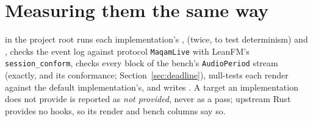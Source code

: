 \section{Measuring them the same way}
 in the project root runs each implementation's
,  (twice, to test determinism) and , checks
the event log against protocol \texttt{MaqamLive} with LeanFM's
\texttt{session\_conform}, checks every block of the bench's \texttt{AudioPeriod}
stream (exactly, and its conformance; Section~\ref{sec:deadline}), null-tests each render against the default
implementation's, and writes . A target an
implementation does not provide is reported as \emph{not provided}, never as a
pass; upstream Rust provides no hooks, so its render and bench columns say so.

